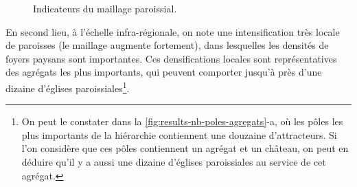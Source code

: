 \begin{figure}[H]
	\centering
	\hspace{5pt}
	\hspace{1em}
	\caption{Indicateurs du maillage paroissial.}
	\label{fig:results-paroisses}
\end{figure}

En second lieu, à l'échelle infra-régionale, on note une intensification très locale de paroisses (le maillage augmente fortement), dans lesquelles les densités de foyers paysans sont importantes.
Ces densifications locales sont représentatives des agrégats les plus importants, qui peuvent comporter jusqu'à près d'une dizaine d'églises paroissiales\footnote{
	On peut le constater dans la \cref{fig:results-nb-poles-agregats}-a, où les pôles les plus importants de la hiérarchie contiennent une douzaine d'attracteurs. Si l'on considère que ces pôles contiennent un agrégat et un château, on peut en déduire qu'il y a aussi une dizaine d'églises paroissiales au service de cet agrégat.
}.

